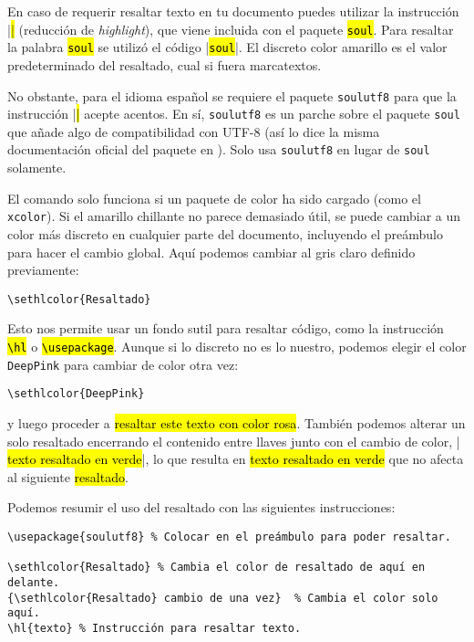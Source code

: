 En caso de requerir resaltar texto en tu documento puedes utilizar la instrucción |\hl| (reducción de \emph{highlight}), que viene incluida con el paquete \hl{\texttt{soul}}. Para resaltar la palabra \hl{\texttt{soul}} se utilizó el código |\hl{\texttt{soul}}|. El discreto color amarillo es el valor predeterminado del resaltado, cual si fuera marcatextos.

No obstante, para el idioma español se requiere el paquete \texttt{soulutf8} para que la instrucción |\hl| acepte acentos. En sí, \texttt{soulutf8} es un parche sobre el paquete \texttt{soul} que añade algo de compatibilidad con UTF-8 (así lo dice la misma documentación oficial del paquete en \cite{bib:soulutf8_package}). Solo usa \texttt{soulutf8} en lugar de \texttt{soul} solamente.

El comando  solo funciona si un paquete de color ha sido cargado (como el \texttt{xcolor}). Si el amarillo chillante no parece demasiado útil, se puede cambiar a un color más discreto en cualquier parte del documento, incluyendo el preámbulo para hacer el cambio global. Aquí podemos cambiar al gris claro definido previamente:

\begin{lstlisting}[style=latex]
\sethlcolor{Resaltado}
\end{lstlisting}

Esto nos permite usar un fondo sutil para resaltar código, como la instrucción \hl{\texttt{\textbackslash{}hl}} o \hl{\texttt{\textbackslash{}usepackage}}. Aunque si lo discreto no es lo nuestro, podemos elegir el color \texttt{DeepPink} para cambiar de color otra vez:
\begin{lstlisting}[style=latex]
\sethlcolor{DeepPink}
\end{lstlisting}

\noindent y luego proceder a \hl{resaltar este texto con color rosa}. También podemos alterar un solo resaltado encerrando el contenido entre llaves junto con el cambio de color, |{ \hl{texto resaltado en verde}}|, lo que resulta en { \hl{texto resaltado en verde}} que no afecta al siguiente \hl{resaltado}.

\noindent Podemos resumir el uso del resaltado con las siguientes instrucciones:
\begin{lstlisting}[style=latex]
\usepackage{soulutf8} % Colocar en el preámbulo para poder resaltar.

\sethlcolor{Resaltado} % Cambia el color de resaltado de aquí en delante.
{\sethlcolor{Resaltado} cambio de una vez}  % Cambia el color solo aquí.
\hl{texto} % Instrucción para resaltar texto.
\end{lstlisting}



